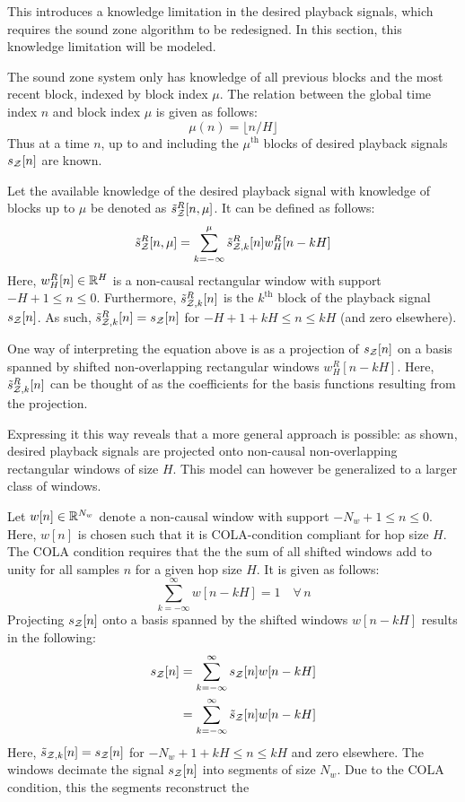 This introduces a knowledge limitation in the desired playback signals, which requires the sound zone algorithm to be redesigned.
In this section, this knowledge limitation will be modeled.

The sound zone system only has knowledge of all previous blocks and the most recent block, indexed by block index $\mu$.
The relation between the global time index $n$ and block index $\mu$ is given as follows:  
\begin{equation}
    \mu(n) = \lfloor n / H \rfloor
\end{equation}
Thus at a time $n$, up to and including the $\mu^\text{th}$ blocks of desired playback signals $s_{\mathcal{Z}}[n]$ are known.

Let the available knowledge of the desired playback signal with knowledge of blocks up to $\mu$ be denoted as $\tilde{s}^R_{\mathcal{Z}}[n, \mu]$.
It can be defined as follows:
\begin{align}
    \tilde{s}^R_{\mathcal{Z}}[n, \mu] = \sum_{k=-\infty}^{\mu} \tilde{s}^R_{\mathcal{Z},k}[n]w^R_H[n - kH]
\end{align}
Here, $w^R_H[n]\in\mathbb{R}^{H}$ is a non-causal rectangular window with support $-H + 1 \leq n \leq 0$. 
Furthermore, $\tilde{s}^R_{\mathcal{Z},k}[n]$ is the $k^\text{th}$ block of the playback signal $s_{\mathcal{Z}}[n]$.
As such, $\tilde{s}^R_{\mathcal{Z},k}[n] = s_{\mathcal{Z}}[n]$ for $-H + 1 + kH \leq n \leq kH$ (and zero elsewhere).  

One way of interpreting the equation above is as a projection of $s_{\mathcal{Z}}[n]$ on a 
basis spanned by shifted non-overlapping rectangular windows $w^R_H[n - kH]$.
Here, $\tilde{s}^R_{\mathcal{Z},k}[n]$ can be thought of as the coefficients for the basis functions resulting from the projection.

Expressing it this way reveals that a more general approach is possible:
as shown, desired playback signals are projected onto non-causal non-overlapping rectangular windows of size $H$.
This model can however be generalized to a larger class of windows.

Let $w[n]\in\mathbb{R}^{N_w}$ denote a non-causal window with support $-N_w + 1 \leq n \leq 0$.
Here, $w[n]$ is chosen such that it is COLA-condition compliant for hop size $H$.
The COLA condition requires that the the sum of all shifted windows add to unity for all samples $n$ for a given hop size $H$. 
It is given as follows:
\begin{equation}
     \sum_{k=-\infty}^{\infty} w[n - kH] = 1 \quad\forall\,n
\end{equation}
Projecting $s_{\mathcal{Z}}[n]$ onto a basis spanned by the shifted windows $w[n - kH]$ results in the following:
\begin{align}
    s_{\mathcal{Z}}[n] &= \sum_{k=-\infty}^{\infty} s_{\mathcal{Z}}[n]w[n - kH] \\
             &= \sum_{k=-\infty}^{\infty} \tilde{s}_{\mathcal{Z}}[n]w[n - kH]
\end{align}
Here, $\tilde{s}_{\mathcal{Z},k}[n] = s_{\mathcal{Z}}[n]$ for $-N_w + 1 + kH \leq n \leq kH$ and zero elsewhere.  
The windows decimate the signal $s_{\mathcal{Z}}[n]$ into segments of size $N_w$. 
Due to the COLA condition, this the segments reconstruct the 

